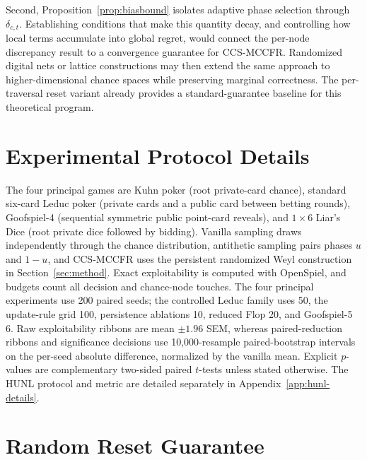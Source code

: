 \documentclass[11pt]{article}
\begin{document}
Second, Proposition~\ref{prop:biasbound} isolates adaptive phase selection through $\delta_{c,t}$. Establishing conditions that make this quantity decay, and controlling how local terms accumulate into global regret, would connect the per-node discrepancy result to a convergence guarantee for CCS-MCCFR. Randomized digital nets or lattice constructions may then extend the same approach to higher-dimensional chance spaces while preserving marginal correctness. The per-traversal reset variant already provides a standard-guarantee baseline for this theoretical program.

\section{Experimental Protocol Details}
\label{app:experiment-protocol}

The four principal games are Kuhn poker (root private-card chance), standard six-card Leduc poker (private cards and a public card between betting rounds), Goofspiel-4 (sequential symmetric public point-card reveals), and $1{\times}6$ Liar's Dice (root private dice followed by bidding). Vanilla sampling draws independently through the chance distribution, antithetic sampling pairs phases $u$ and $1-u$, and CCS-MCCFR uses the persistent randomized Weyl construction in Section~\ref{sec:method}. Exact exploitability is computed with OpenSpiel, and budgets count all decision and chance-node touches. The four principal experiments use 200 paired seeds; the controlled Leduc family uses 50, the update-rule grid 100, persistence ablations 10, reduced Flop 20, and Goofspiel-5 6. Raw exploitability ribbons are mean $\pm1.96$ SEM, whereas paired-reduction ribbons and significance decisions use 10{,}000-resample paired-bootstrap intervals on the per-seed absolute difference, normalized by the vanilla mean. Explicit $p$-values are complementary two-sided paired $t$-tests unless stated otherwise. The HUNL protocol and metric are detailed separately in Appendix~\ref{app:hunl-details}.

\section{Random Reset Guarantee}
\label{app:reset-proof}
\end{document}
